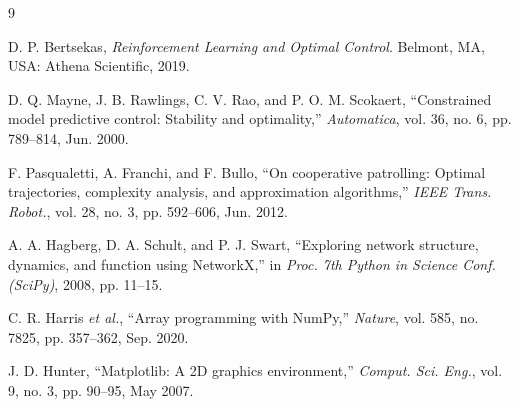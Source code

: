 \documentclass[conference]{IEEEtran}
\begin{document}
\begin{thebibliography}{9}

D. P. Bertsekas,
\emph{Reinforcement Learning and Optimal Control}.
Belmont, MA, USA: Athena Scientific, 2019.

D. Q. Mayne, J. B. Rawlings, C. V. Rao, and P. O. M. Scokaert,
``Constrained model predictive control: Stability and optimality,''
\emph{Automatica}, vol. 36, no. 6, pp. 789--814, Jun. 2000.

F. Pasqualetti, A. Franchi, and F. Bullo,
``On cooperative patrolling: Optimal trajectories, complexity analysis, and
approximation algorithms,''
\emph{IEEE Trans. Robot.}, vol. 28, no. 3, pp. 592--606, Jun. 2012.

A. A. Hagberg, D. A. Schult, and P. J. Swart,
``Exploring network structure, dynamics, and function using NetworkX,''
in \emph{Proc. 7th Python in Science Conf. (SciPy)}, 2008, pp. 11--15.

C. R. Harris \emph{et al.},
``Array programming with NumPy,''
\emph{Nature}, vol. 585, no. 7825, pp. 357--362, Sep. 2020.

J. D. Hunter,
``Matplotlib: A 2D graphics environment,''
\emph{Comput. Sci. Eng.}, vol. 9, no. 3, pp. 90--95, May 2007.

\end{thebibliography}
\end{document}
